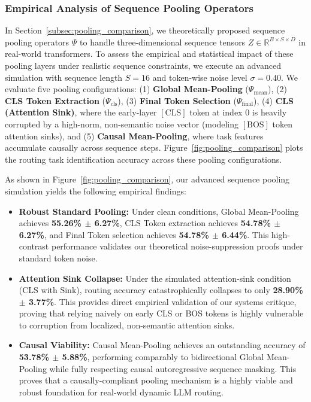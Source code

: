 \subsubsection{Empirical Analysis of Sequence Pooling Operators}
\label{subsec:pooling_analysis}
In Section~\ref{subsec:pooling_comparison}, we theoretically proposed sequence pooling operators $\Psi$ to handle three-dimensional sequence tensors $Z \in \mathbb{R}^{B \times S \times D}$ in real-world transformers. To assess the empirical and statistical impact of these pooling layers under realistic sequence constraints, we execute an advanced simulation with sequence length $S=16$ and token-wise noise level $\sigma = 0.40$. We evaluate five pooling configurations: (1) \textbf{Global Mean-Pooling} ($\Psi_{\text{mean}}$), (2) \textbf{CLS Token Extraction} ($\Psi_{\text{cls}}$), (3) \textbf{Final Token Selection} ($\Psi_{\text{final}}$), (4) \textbf{CLS (Attention Sink)}, where the early-layer $[\text{CLS}]$ token at index 0 is heavily corrupted by a high-norm, non-semantic noise vector (modeling $[\text{BOS}]$ token attention sinks), and (5) \textbf{Causal Mean-Pooling}, where task features accumulate causally across sequence steps. Figure~\ref{fig:pooling_comparison} plots the routing task identification accuracy across these pooling configurations.

As shown in Figure~\ref{fig:pooling_comparison}, our advanced sequence pooling simulation yields the following empirical findings:
\begin{itemize}
    \item \textbf{Robust Standard Pooling:} Under clean conditions, Global Mean-Pooling achieves \textbf{55.26\% $\pm$ 6.27\%}, CLS Token extraction achieves \textbf{54.78\% $\pm$ 6.27\%}, and Final Token selection achieves \textbf{54.78\% $\pm$ 6.44\%}. This high-contrast performance validates our theoretical noise-suppression proofs under standard token noise.
    \item \textbf{Attention Sink Collapse:} Under the simulated attention-sink condition (CLS with Sink), routing accuracy catastrophically collapses to only \textbf{28.90\% $\pm$ 3.77\%}. This provides direct empirical validation of our systems critique, proving that relying naively on early CLS or BOS tokens is highly vulnerable to corruption from localized, non-semantic attention sinks.
    \item \textbf{Causal Viability:} Causal Mean-Pooling achieves an outstanding accuracy of \textbf{53.78\% $\pm$ 5.88\%}, performing comparably to bidirectional Global Mean-Pooling while fully respecting causal autoregressive sequence masking. This proves that a causally-compliant pooling mechanism is a highly viable and robust foundation for real-world dynamic LLM routing.
\end{itemize}

